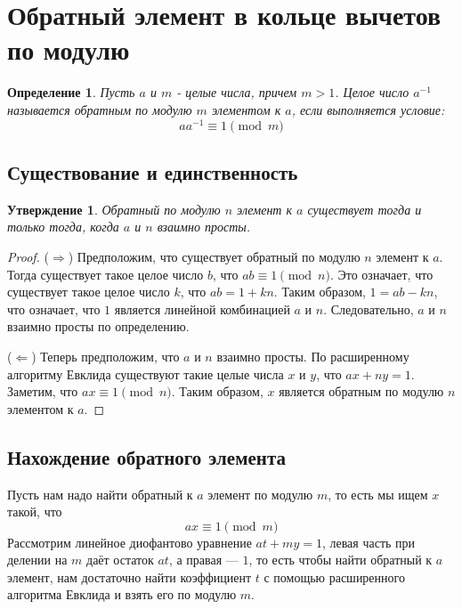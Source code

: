 \documentclass[12pt, a4paper, openany]{book}
\newtheorem*{definition}{Определение}
\newtheorem*{statement}{Утверждение}
\begin{document}
\section{Обратный элемент в кольце вычетов по модулю}

\begin{definition}
    Пусть $a$ и $m$ - целые числа, причем $m > 1$. Целое число $a^{-1}$ называется обратным по модулю $m$ элементом к $a$, если выполняется условие:
    \[aa^{-1} \equiv 1 \pmod{m}\]
\end{definition}

\newpage
\subsection{Существование и единственность}

\begin{statement}
    Обратный по модулю $n$ элемент к $a$ существует тогда и только тогда, когда $a$ и $n$ взаимно просты.
\end{statement}

\begin{proof} 
    ($\Rightarrow$) Предположим, что существует обратный по модулю $n$ элемент к $a$. Тогда существует такое целое число $b$, что $ab \equiv 1 \pmod{n}$. Это означает, что существует такое целое число $k$, что $ab = 1 + kn$. Таким образом, $1 = ab - kn$, что означает, что $1$ является линейной комбинацией $a$ и $n$. Следовательно, $a$ и $n$ взаимно просты по определению.
    
    ($\Leftarrow$) Теперь предположим, что $a$ и $n$ взаимно просты. По расширенному алгоритму Евклида существуют такие целые числа $x$ и $y$, что $ax + ny = 1$. Заметим, что $ax \equiv 1 \pmod{n}$. Таким образом, $x$ является обратным по модулю $n$ элементом к $a$.
\end{proof}

\subsection{Нахождение обратного элемента}

    Пусть нам надо найти обратный к $a$ элемент по модулю $m$, то есть мы ищем $x$ такой, что \[ax \equiv 1 \pmod{m}\] 
    Рассмотрим линейное диофантово уравнение $at+my=1$, левая часть при делении на $m$ даёт остаток $at$, а правая --- $1$, то есть чтобы найти обратный к $a$ элемент, нам достаточно найти коэффициент $t$ с помощью расширенного алгоритма Евклида и взять его по модулю $m$.
\end{document}
